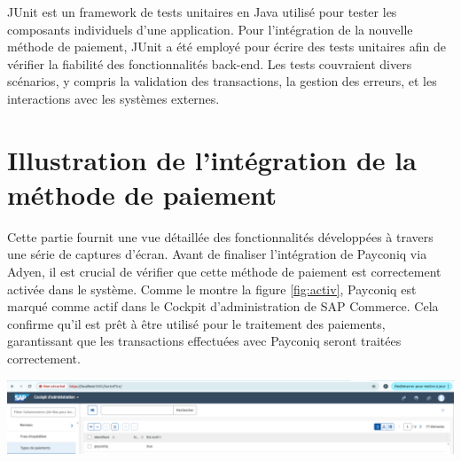 JUnit est un framework de tests unitaires en Java utilisé pour tester les composants individuels d'une application. Pour l'intégration de la nouvelle méthode de paiement, JUnit a été employé pour écrire des tests unitaires afin de vérifier la fiabilité des fonctionnalités back-end. Les tests couvraient divers scénarios, y compris la validation des transactions, la gestion des erreurs, et les interactions avec les systèmes externes.
\section{Illustration de l'intégration de la méthode de paiement}
Cette partie fournit une vue détaillée des fonctionnalités développées à travers une série de captures d’écran.
Avant de finaliser l'intégration de Payconiq via Adyen, il est crucial de vérifier que cette méthode de paiement est correctement activée dans le système. Comme le montre la figure \ref{fig:activ}, Payconiq est marqué comme actif dans le Cockpit d'administration de SAP Commerce. 
Cela confirme qu'il est prêt à être utilisé pour le traitement des paiements, garantissant que les transactions effectuées avec Payconiq seront traitées correctement.
\begin{center}
    \centering
    \includegraphics[width=19cm]{Figures/Screens/VERIFIER QUE payment activer.png}
    \label{fig:activ}
\end{center}

